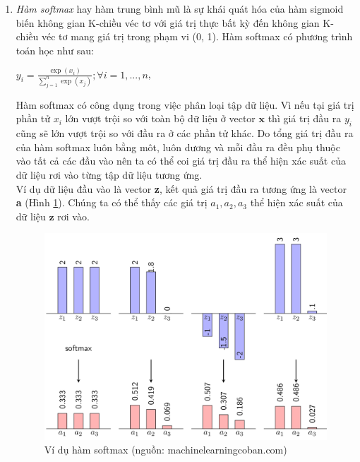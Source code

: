 \begin{enumerate}
\item
\label{sec:softmax}
\textit{Hàm softmax} hay hàm trung bình mũ là sự khái quát hóa của hàm sigmoid biến không gian K-chiều véc tơ  với giá trị thực bất kỳ đến không gian K-chiều véc tơ  mang giá trị trong phạm vi (0, 1).
Hàm softmax có phương trình toán học như sau:
\begin{center}
	$y_i=\frac{\exp({x_i})}{\sum^{n}_{j=1}{\exp({x_j})}}; \forall i=1,...,n$, 
\end{center}	
Hàm softmax có công dụng trong việc phân loại tập dữ liệu. Vì nếu tại giá trị phần tử $x_i$ lớn vượt trội so với toàn bộ dữ liệu ở vector $\textbf{x}$ thì giá trị đầu ra $y_i$ cũng sẽ lớn vượt trội so với đầu ra ở các phần tử khác. Do tổng giá trị đầu ra của hàm softmax luôn bằng môt, luôn dương và mỗi đầu ra đều phụ thuộc vào tất cả các đầu vào nên ta có thể coi giá trị đầu ra thể hiện xác suất của dữ liệu rơi vào từng tập dữ liệu tương ứng.\\
Ví dụ dữ liệu đầu vào là vector \textbf{z}, kết quả giá trị đầu ra tương ứng là vector \textbf{a} (Hình \ref{fig:vdsoftmax}). Chúng ta có thể thấy các giá trị $a_1,a_2,a_3$ thể hiện xác suất của dữ liệu $\textbf{z}$ rơi vào.
\begin{center}
	\begin{figure}[htp]
	\begin{center}
		\includegraphics[scale=0.1]{chap3/image/softmax_ex.png}
	\end{center}			
	\caption{Ví dụ hàm softmax (nguồn: machinelearningcoban.com)}
	\label{fig:vdsoftmax}
	\end{figure}
\end{center}

\end{enumerate}
